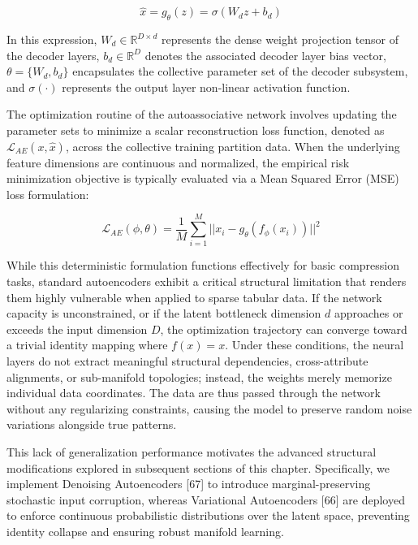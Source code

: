 \documentclass[11pt,a4paper]{report}
\begin{document}
\begin{equation}
\hat{x}=g_{\theta}(z)=\sigma(W_{d}z+b_{d})
\end{equation}

In this expression, $W_{d}\in\mathbb{R}^{D\times d}$ represents the dense weight projection tensor of the decoder layers, $b_{d}\in\mathbb{R}^{D}$ denotes the associated decoder layer bias vector, $\theta=\{W_{d},b_{d}\}$ encapsulates the collective parameter set of the decoder subsystem, and $\sigma(\cdot)$ represents the output layer non-linear activation function. 

The optimization routine of the autoassociative network involves updating the parameter sets to minimize a scalar reconstruction loss function, denoted as $\mathcal{L}_{AE}(x,\hat{x})$, across the collective training partition data. When the underlying feature dimensions are continuous and normalized, the empirical risk minimization objective is typically evaluated via a Mean Squared Error (MSE) loss formulation:

\begin{equation}
\mathcal{L}_{AE}(\phi,\theta)=\frac{1}{M}\sum_{i=1}^{M}||x_{i}-g_{\theta}(f_{\phi}(x_{i}))||^{2}
\end{equation}

While this deterministic formulation functions effectively for basic compression tasks, standard autoencoders exhibit a critical structural limitation that renders them highly vulnerable when applied to sparse tabular data. If the network capacity is unconstrained, or if the latent bottleneck dimension $d$ approaches or exceeds the input dimension $D$, the optimization trajectory can converge toward a trivial identity mapping where $f(x)=x$. Under these conditions, the neural layers do not extract meaningful structural dependencies, cross-attribute alignments, or sub-manifold topologies; instead, the weights merely memorize individual data coordinates. The data are thus passed through the network without any regularizing constraints, causing the model to preserve random noise variations alongside true patterns. 

This lack of generalization performance motivates the advanced structural modifications explored in subsequent sections of this chapter. Specifically, we implement Denoising Autoencoders [67] to introduce marginal-preserving stochastic input corruption, whereas Variational Autoencoders [66] are deployed to enforce continuous probabilistic distributions over the latent space, preventing identity collapse and ensuring robust manifold learning.
\end{document}
